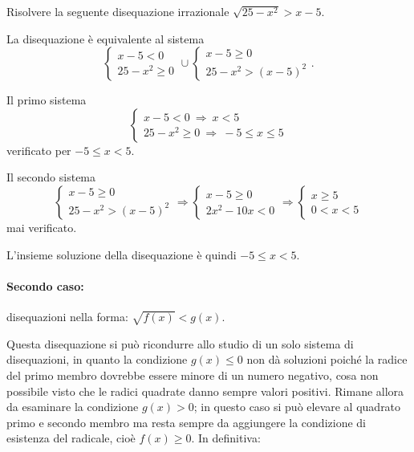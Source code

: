 \begin{exrig}
\begin{esempio}
Risolvere la seguente disequazione irrazionale $\sqrt{25-x^2}>x-5$.

La disequazione è equivalente al sistema 
\[\left\{\begin{array}{l}{x-5<0}\\{25-x^2\ge 0}\end{array}\right.\cup \left\{\begin{array}{l}x-5\ge 0\\25-x^2>(x-5)^2 \end{array}\right..\]

Il primo sistema 
\[\left\{\begin{array}{l}{x-5<0 \:\Rightarrow\: x<5}\\{25-x^2\ge 0 \:\Rightarrow\: -5\le x\le 5}\end{array}\right.\] verificato per $-5\le x< 5$.

Il secondo sistema \[\left\{\begin{array}{l}x-5\ge 0\\25-x^2>(x-5)^2\end{array}\right.\Rightarrow \left\{\begin{array}{l}x-5\ge 0\\2x^2-10x<0\end{array}\right.\Rightarrow \left\{\begin{array}{l}x\ge 5\\0<x<5\end{array}\right.\] mai verificato.

\begin{center}
 
\end{center}

L'insieme soluzione della disequazione è quindi $-5\le x< 5$.
\end{esempio}
\end{exrig}

\paragraph{Secondo caso:} disequazioni nella forma: ${\sqrt{f(x)}<g(x)}$.

Questa disequazione si può ricondurre allo studio di un solo sistema di disequazioni, in quanto la condizione $g(x)\le 0$ non dà soluzioni poiché la radice del primo membro dovrebbe essere minore di un numero negativo, cosa non possibile visto che le radici quadrate danno sempre valori positivi. Rimane allora da esaminare la condizione $g(x)>0$; in questo caso si può elevare al quadrato primo e secondo membro ma resta sempre da aggiungere la condizione di esistenza del radicale, cioè $f(x)\ge 0$. In definitiva:

